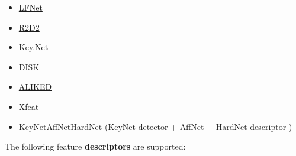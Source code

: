 \documentclass{article}
\begin{document}
\begin{itemize}
    \item \href{https://github.com/vcg-uvic/lf-net-release}{LFNet} \cite{ono2018lf}
    \item \href{https://github.com/naver/r2d2}{R2D2} \cite{revaud2019r2d2}
    \item \href{https://github.com/axelBarroso/Key.Net}{Key.Net} \cite{barroso2020key}
    \item \href{https://arxiv.org/abs/2006.13566}{DISK} \cite{tyszkiewicz2020disk}
    \item \href{https://arxiv.org/abs/2304.03608}{ALIKED} \cite{barroso2023alike}
    \item \href{https://arxiv.org/abs/2404.19174}{Xfeat} \cite{barroso2024xfeat}
    \item \href{https://github.com/axelBarroso/Key.Net}{KeyNetAffNetHardNet} (KeyNet detector \cite{barroso2020key} + AffNet + HardNet descriptor \cite{mishchuk2017working})
\end{itemize}

The following feature \textbf{descriptors} are supported: 
\end{document}

